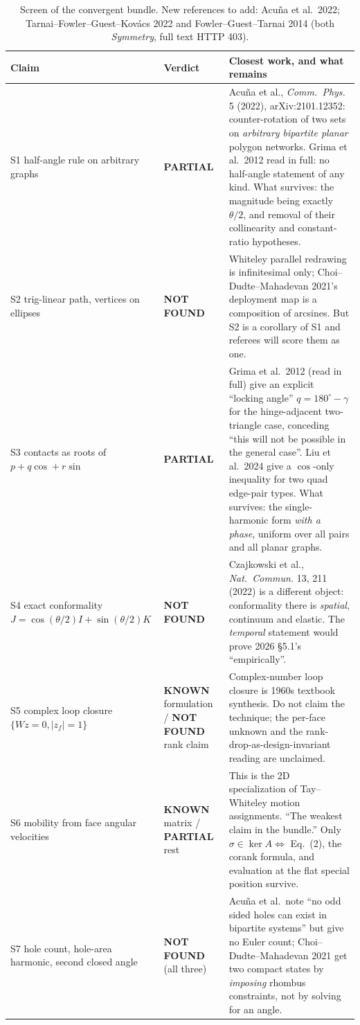 \documentclass[10pt,a4paper]{article}
\begin{document}
\begin{table}[h]
\centering\footnotesize
\begin{tabular}{@{}p{34mm}p{20mm}p{100mm}@{}}
\toprule
Claim & Verdict & Closest work, and what remains \\
\midrule
S1 half-angle rule on arbitrary graphs & \textbf{PARTIAL} & Acu\~na et al., \emph{Comm.\ Phys.} 5 (2022), arXiv:2101.12352: counter-rotation of two sets on \emph{arbitrary bipartite planar} polygon networks. Grima et al.\ 2012 read in full: no half-angle statement of any kind. What survives: the magnitude being exactly $\theta/2$, and removal of their collinearity and constant-ratio hypotheses. \\
S2 trig-linear path, vertices on ellipses & \textbf{NOT FOUND} & Whiteley parallel redrawing is infinitesimal only; Choi--Dudte--Mahadevan 2021's deployment map is a composition of arcsines. But S2 is a corollary of S1 and referees will score them as one. \\
S3 contacts as roots of $p+q\cos+r\sin$ & \textbf{PARTIAL} & Grima et al.\ 2012 (read in full) give an explicit ``locking angle'' $q = 180^\circ - \gamma$ for the hinge-adjacent two-triangle case, conceding ``this will not be possible in the general case''. Liu et al.\ 2024 give a $\cos$-only inequality for two quad edge-pair types. What survives: the single-harmonic form \emph{with a phase}, uniform over all pairs and all planar graphs. \\
S4 exact conformality $J=\cos(\theta/2)I+\sin(\theta/2)K$ & \textbf{NOT FOUND} & Czajkowski et al., \emph{Nat.\ Commun.} 13, 211 (2022) is a different object: conformality there is \emph{spatial}, continuum and elastic. The \emph{temporal} statement would prove 2026 \S5.1's ``empirically''. \\
S5 complex loop closure $\{Wz=0, |z_f|=1\}$ & \textbf{KNOWN} formulation / \textbf{NOT FOUND} rank claim & Complex-number loop closure is 1960s textbook synthesis. Do not claim the technique; the per-face unknown and the rank-drop-as-design-invariant reading are unclaimed. \\
S6 mobility from face angular velocities & \textbf{KNOWN} matrix / \textbf{PARTIAL} rest & This is the 2D specialization of Tay--Whiteley motion assignments. ``The weakest claim in the bundle.'' Only $\sigma\in\ker A \Leftrightarrow$ Eq.~(2), the corank formula, and evaluation at the flat special position survive. \\
S7 hole count, hole-area harmonic, second closed angle & \textbf{NOT FOUND} (all three) & Acu\~na et al.\ note ``no odd sided holes can exist in bipartite systems'' but give no Euler count; Choi--Dudte--Mahadevan 2021 get two compact states by \emph{imposing} rhombus constraints, not by solving for an angle. \\
\bottomrule
\end{tabular}
\caption{Screen of the convergent bundle. New references to add: Acu\~na et al.\ 2022; Tarnai--Fowler--Guest--Kov\'acs 2022 and Fowler--Guest--Tarnai 2014 (both \emph{Symmetry}, full text HTTP 403).}
\end{table}
\end{document}
